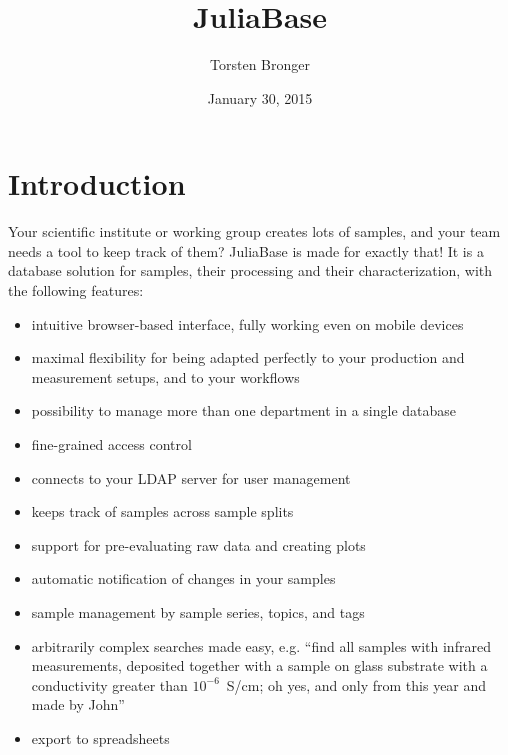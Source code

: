 \documentclass[a4paper,11pt,english]{sphinxmanual}
\title{JuliaBase}
\date{January 30, 2015}
\author{Torsten Bronger}
\begin{document}
\maketitle
\tableofcontents
{}\label{toc::doc}



\chapter{Introduction}
\label{index:introduction}\label{index::doc}\label{index:juliabase}
Your scientific institute or working group creates lots of samples, and your
team needs a tool to keep track of them?  JuliaBase is made for exactly that!
It is a database solution for samples, their processing and their
characterization, with the following features:
\begin{itemize}
\item {} 
intuitive browser-based interface, fully working even on mobile devices

\item {} 
maximal flexibility for being adapted perfectly to your production and
measurement setups, and to your workflows

\item {} 
possibility to manage more than one department in a single database

\item {} 
fine-grained access control

\item {} 
connects to your LDAP server for user management

\item {} 
keeps track of samples across sample splits

\item {} 
support for pre-evaluating raw data and creating plots

\item {} 
automatic notification of changes in your samples

\item {} 
sample management by sample series, topics, and tags

\item {} 
arbitrarily complex searches made easy, e.g. “find all samples with infrared
measurements, deposited together with a sample on glass substrate with a
conductivity greater than \(10^{-6}\) S/cm; oh yes, and only from this year and made
by John”

\item {} 
export to spreadsheets


\end{itemize}
\end{document}
